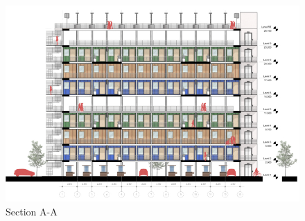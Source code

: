 ﻿%
\begin{figure}[H]
	\centering
	\includegraphics[width=\linewidth]{src/graphics/container-village--section-aa.jpg}
	\caption*{%
		Section A-A
	}
	\label{
		fig:container-village--section-aa
	}
\end{figure}
